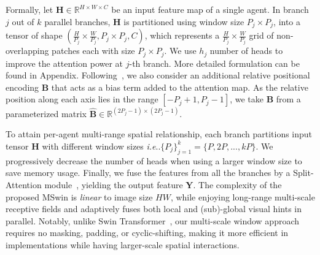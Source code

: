 \documentclass[runningheads]{llncs}
\makeatletter
\DeclareRobustCommand\onedot{\futurelet\@let@token\@onedot}
\def\@onedot{\ifx\@let@token.\else.\null\fi\xspace}
\def\ie{\emph{i.e}\onedot} \def\Ie{\emph{I.e}\onedot}
\makeatother
\begin{document}
Formally, let $\mathbf{H}\in\mathbb{R}^{H\times W\times C}$ be an input feature map of a single agent. In branch $j$ out of $k$ parallel branches, $\mathbf{H}$ is partitioned using window size $P_j\! \times\! P_j$, into a tensor of shape $(\frac{H}{P_j}\times\frac{W}{P_j},P_j\times P_j,C)$, which represents a $\frac{H}{P_j}\times\frac{W}{P_j}$ grid of non-overlapping patches each with size $P_j\times P_j$. We use $h_j$ number of heads to improve the attention power at $j$-th branch. More detailed formulation can be found in Appendix.
Following~\cite{liu2021swin,hu2019local}, we also consider an additional relative positional encoding $\mathbf{B}$ that acts as a bias term added to the attention map. As the relative position along each axis lies in the range $[-P_j+1,P_j-1]$,  we take $\mathbf{B}$ from a parameterized matrix $\hat{\mathbf{B}}\in\mathbb{R}^{(2P_j-1)\times(2P_j-1)}$.

To attain per-agent multi-range spatial relationship, each branch partitions input tensor $\mathbf{H}$ with different window sizes \ie $\{P_j\}_{j=1}^k=\{P,2P,...,kP\}$. 
We progressively decrease the number of heads when using a larger window size to save memory usage. Finally, we fuse the features from all the branches by a Split-Attention module~\cite{zhang2020resnest}, yielding the output feature $\mathbf{Y}$.
The complexity of the proposed MSwin is \textit{linear} to image size $HW$, while enjoying long-range multi-scale receptive fields and adaptively fuses both local and (sub)-global visual hints in parallel. Notably, unlike Swin Transformer~\cite{liu2021swin}, our multi-scale window approach requires no masking, padding, or cyclic-shifting, making it more efficient in implementations while having larger-scale spatial interactions.
\end{document}

